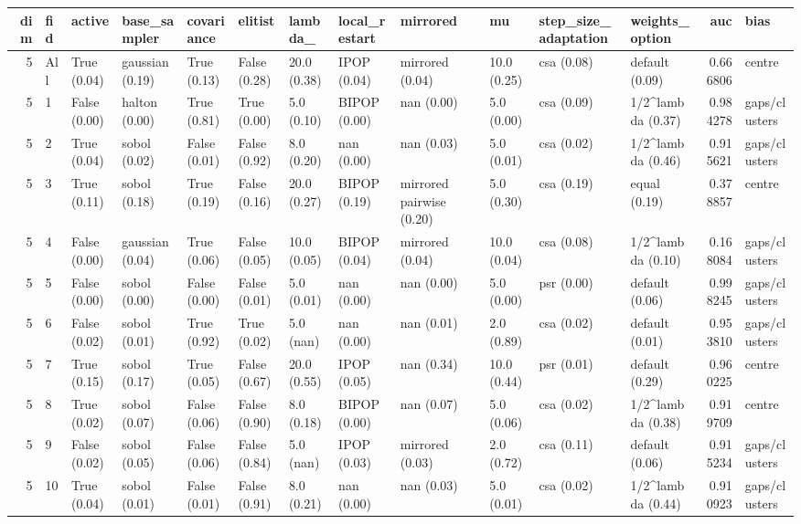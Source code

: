 \begin{tabular}{rlllllllllllrl}
\toprule
dim & fid & active & base_sampler & covariance & elitist & lambda_ & local_restart & mirrored & mu & step_size_adaptation & weights_option & auc & bias \\
\midrule
5 & All & True (0.04) & gaussian (0.19) & True (0.13) & False (0.28) & 20.0 (0.38) & IPOP (0.04) & mirrored (0.04) & 10.0 (0.25) & csa (0.08) & default (0.09) & 0.666806 & centre \\
5 & 1 & False (0.00) & halton (0.00) & True (0.81) & True (0.00) & 5.0 (0.10) & BIPOP (0.00) & nan (0.00) & 5.0 (0.00) & csa (0.09) & 1/2^lambda (0.37) & 0.984278 & gaps/clusters \\
5 & 2 & True (0.04) & sobol (0.02) & False (0.01) & False (0.92) & 8.0 (0.20) & nan (0.00) & nan (0.03) & 5.0 (0.01) & csa (0.02) & 1/2^lambda (0.46) & 0.915621 & gaps/clusters \\
5 & 3 & True (0.11) & sobol (0.18) & True (0.19) & False (0.16) & 20.0 (0.27) & BIPOP (0.19) & mirrored pairwise (0.20) & 5.0 (0.30) & csa (0.19) & equal (0.19) & 0.378857 & centre \\
5 & 4 & False (0.00) & gaussian (0.04) & True (0.06) & False (0.05) & 10.0 (0.05) & BIPOP (0.04) & mirrored (0.04) & 10.0 (0.04) & csa (0.08) & 1/2^lambda (0.10) & 0.168084 & gaps/clusters \\
5 & 5 & False (0.00) & sobol (0.00) & False (0.00) & False (0.01) & 5.0 (0.01) & nan (0.00) & nan (0.00) & 5.0 (0.00) & psr (0.00) & default (0.06) & 0.998245 & gaps/clusters \\
5 & 6 & False (0.02) & sobol (0.01) & True (0.92) & True (0.02) & 5.0 (nan) & nan (0.00) & nan (0.01) & 2.0 (0.89) & csa (0.02) & default (0.01) & 0.953810 & gaps/clusters \\
5 & 7 & True (0.15) & sobol (0.17) & True (0.05) & False (0.67) & 20.0 (0.55) & IPOP (0.05) & nan (0.34) & 10.0 (0.44) & psr (0.01) & default (0.29) & 0.960225 & centre \\
5 & 8 & True (0.02) & sobol (0.07) & False (0.06) & False (0.90) & 8.0 (0.18) & BIPOP (0.00) & nan (0.07) & 5.0 (0.06) & csa (0.02) & 1/2^lambda (0.38) & 0.919709 & centre \\
5 & 9 & False (0.02) & sobol (0.05) & False (0.06) & False (0.84) & 5.0 (nan) & IPOP (0.03) & mirrored (0.03) & 2.0 (0.72) & csa (0.11) & default (0.06) & 0.915234 & gaps/clusters \\
5 & 10 & True (0.04) & sobol (0.01) & False (0.01) & False (0.91) & 8.0 (0.21) & nan (0.00) & nan (0.03) & 5.0 (0.01) & csa (0.02) & 1/2^lambda (0.44) & 0.910923 & gaps/clusters \\

\end{tabular}
